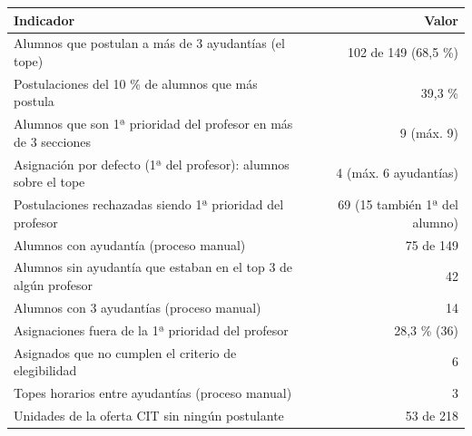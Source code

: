 \begin{tabular}{lr}
\toprule
\textbf{Indicador} & \textbf{Valor} \\
\midrule
Alumnos que postulan a más de 3 ayudantías (el tope) & 102 de 149 (68,5 \%) \\
Postulaciones del 10 \% de alumnos que más postula & 39,3 \% \\
Alumnos que son 1ª prioridad del profesor en más de 3 secciones & 9 (máx. 9) \\
Asignación por defecto (1ª del profesor): alumnos sobre el tope & 4 (máx. 6 ayudantías) \\
Postulaciones rechazadas siendo 1ª prioridad del profesor & 69 (15 también 1ª del alumno) \\
Alumnos con ayudantía (proceso manual) & 75 de 149 \\
Alumnos sin ayudantía que estaban en el top 3 de algún profesor & 42 \\
Alumnos con 3 ayudantías (proceso manual) & 14 \\
Asignaciones fuera de la 1ª prioridad del profesor & 28,3 \% (36) \\
Asignados que no cumplen el criterio de elegibilidad & 6 \\
Topes horarios entre ayudantías (proceso manual) & 3 \\
Unidades de la oferta CIT sin ningún postulante & 53 de 218 \\
\bottomrule
\end{tabular}
